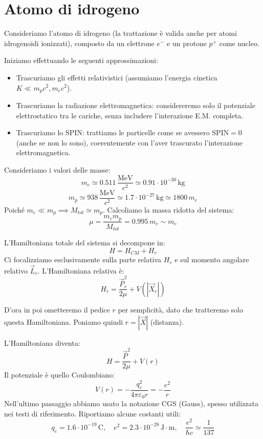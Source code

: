 \section{Atomo di idrogeno}

Consideriamo l'atomo di idrogeno (la trattazione è valida anche per atomi idrogenoidi ionizzati), composto da un elettrone \( e^- \) e un protone \( p^+ \) come nucleo.

Iniziamo effettuando le seguenti approssimazioni:
\begin{itemize}
    \item Trascuriamo gli effetti relativistici (assumiamo l'energia cinetica \( K \ll m_p c^2, m_e c^2 \)).
    \item Trascuriamo la radiazione elettromagnetica: considereremo solo il potenziale elettrostatico tra le cariche, senza includere l'interazione E.M. completa.
    \item Trascuriamo lo SPIN: trattiamo le particelle come se avessero \( \text{SPIN}=0 \) (anche se non lo sono), coerentemente con l'aver trascurato l'interazione elettromagnetica.
\end{itemize}

Consideriamo i valori delle masse:
\[
m_e \simeq 0.511 \, \frac{\text{MeV}}{c^2} \simeq 0.91 \cdot 10^{-30} \, \text{kg}
\]
\[
m_p \simeq 938 \, \frac{\text{MeV}}{c^2} \simeq 1.7 \cdot 10^{-27} \, \text{kg} \simeq 1800 \, m_e
\]
Poiché \( m_e \ll m_p \implies M_{tot} \simeq m_p \).
Calcoliamo la massa ridotta del sistema:
\[
\mu = \frac{m_e m_p}{M_{tot}} = 0.995 \, m_e \sim m_e
\]

L'Hamiltoniana totale del sistema si decompone in:
\[
H = H_{CM} + H_r
\]
Ci focalizziamo esclusivamente sulla parte relativa \( H_r \) e sul momento angolare relativo \( \vec{L}_r \).
L'Hamiltoniana relativa è:
\begin{equation}
    H_r = \frac{\vec{P}_r^2}{2\mu} + V(|\vec{X}_r|)
\end{equation}
\begin{attention}
    D'ora in poi ometteremo il pedice \( r \) per semplicità, dato che tratteremo solo questa Hamiltoniana. Poniamo quindi \( r = |\vec{X}| \) (distanza).
\end{attention}

L'Hamiltoniana diventa:
\[
H = \frac{\vec{P}^2}{2\mu} + V(r)
\]
Il potenziale è quello Coulombiano:
\begin{equation}
    V(r) = - \frac{q_e^2}{4\pi\varepsilon_0 r} = - \frac{e^2}{r}
\end{equation}
Nell'ultimo passaggio abbiamo usato la notazione CGS (Gauss), spesso utilizzata nei testi di riferimento.
Riportiamo alcune costanti utili:
\[
q_e = 1.6 \cdot 10^{-19} \, \text{C}, \quad e^2 = 2.3 \cdot 10^{-28} \, \text{J}\cdot\text{m}, \quad \frac{e^2}{\hbar c} \simeq \frac{1}{137}
\]

